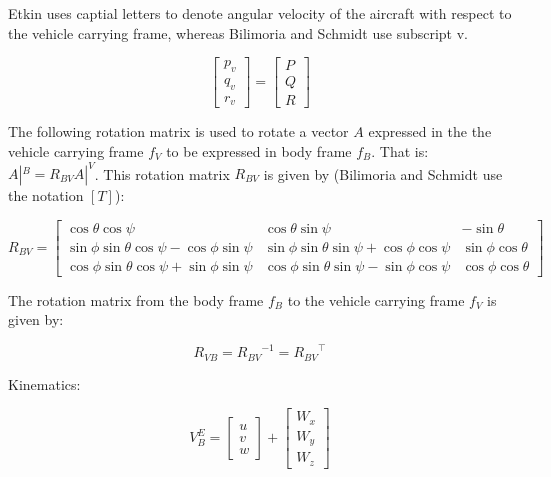 Etkin uses captial letters to denote angular velocity of the aircraft with respect to the vehicle carrying frame, whereas Bilimoria and Schmidt use subscript v.

\begin{equation*}
  \begin{bmatrix}
    p_{v} \\
    q_{v} \\
    r_{v}
  \end{bmatrix}=
  \begin{bmatrix}
    P \\
    Q \\
    R
  \end{bmatrix}
\end{equation*}

The following rotation matrix is used to rotate a vector $A$ expressed in the the vehicle carrying frame $f_{V}$ to be expressed in body frame $f_{B}$.
That is: $A|^{B}=R_{BV}A|^{V}$.
This rotation matrix $R_{BV}$ is given by (Bilimoria and Schmidt use the notation $[T]$):

\begin{equation*}
  R_{BV}=
  \begin{bmatrix}
    \cos{\theta}\cos{\psi} & \cos{\theta}\sin{\psi} & -\sin{\theta} \\
    \sin{\phi}\sin{\theta}\cos{\psi}-\cos{\phi}\sin{\psi} &  \sin{\phi}\sin{\theta}\sin{\psi}+\cos{\phi}\cos{\psi} & \sin{\phi}\cos{\theta}\\
    \cos{\phi}\sin{\theta}\cos{\psi}+\sin{\phi}\sin{\psi} &  \cos{\phi}\sin{\theta}\sin{\psi}-\sin{\phi}\cos{\psi} & \cos{\phi}\cos{\theta}
  \end{bmatrix}
\end{equation*}

The rotation matrix from the body frame $f_{B}$  to the vehicle carrying frame $f_{V}$ is given by:

\begin{equation*}
  R_{VB}={R_{BV}}^{-1}={R_{BV}}^{\top}
\end{equation*}

Kinematics:

\begin{equation}
  V^{E}_{B}=
  \begin{bmatrix}
    u \\
    v \\
    w
  \end{bmatrix} +
  \begin{bmatrix}
    W_{x} \\
    W_{y} \\
    W_{z}
  \end{bmatrix}
\end{equation}

